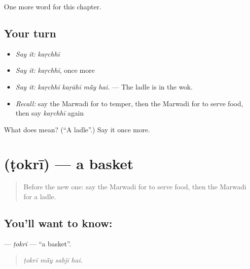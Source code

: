 \begin{grammarlens}[title={What you've built}]
One more word for this chapter.
\end{grammarlens}

\subsection*{Your turn}
\begin{itemize}
\raggedright
  \item \emph{Say it:} \emph{kaṛchhī}
  \item \emph{Say it:} \emph{kaṛchhī}, once more
  \item \emph{Say it:} \emph{kaṛchhī kaṛāhī mā̃y hai.} — The ladle is in the wok.
  \item \emph{Recall:} say the Marwadi for to temper, then the Marwadi for to serve food, then say \emph{kaṛchhī} again
\end{itemize}

\begin{tcolorbox}[breakable,colback=teal!4,colframe=teal!35!black,title={Before you move on}]
What does  mean? (\textquotedblleft{}A ladle\textquotedblright{}.) Say it once more.
\end{tcolorbox}
\section[\texorpdfstring{\mw{टोकरी} (ṭokrī)}{टोकरी (ṭokrī)}]{ (ṭokrī) — a basket}

\label{lesson:MW-C183-tokri}



\begin{quote}
Before the new one: say the Marwadi for to serve food, then the Marwadi for a ladle.
\end{quote}

\subsection*{You'll want to know: }
\textbf{} — \emph{ṭokrī} — \textquotedblleft{}a basket\textquotedblright{}.

\begin{quote}
   
\end{quote}

\begin{quote}
\emph{ṭokrī mā̃y sabjī hai.}
\end{quote}

